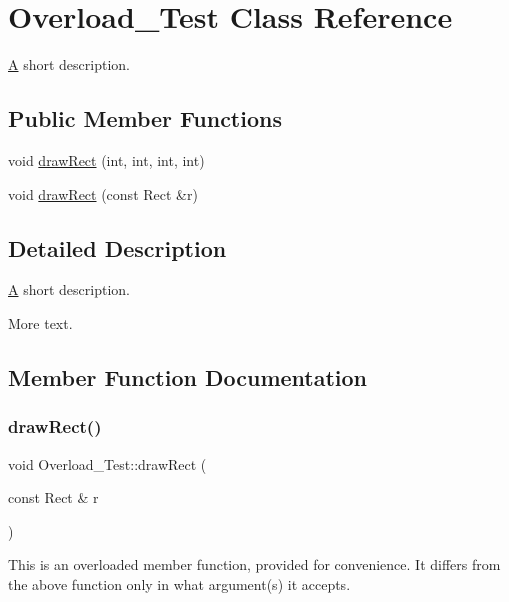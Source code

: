 \hypertarget{class_overload___test}{}\section{Overload\+\_\+\+Test Class Reference}
\label{class_overload___test}


\mbox{\hyperlink{class_a}{A}} short description.  


\subsection*{Public Member Functions}
\begin{DoxyCompactItemize}
\item 
void \mbox{\hyperlink{class_overload___test_a840305784a1944b4de9826a1f4204365}{draw\+Rect}} (int, int, int, int)
\item 
void \mbox{\hyperlink{class_overload___test_a7a613f50092cbc0ef830a818d9f3409c}{draw\+Rect}} (const Rect \&r)
\end{DoxyCompactItemize}


\subsection{Detailed Description}
\mbox{\hyperlink{class_a}{A}} short description. 

More text. 

\subsection{Member Function Documentation}
\mbox{\label{class_overload___test_a7a613f50092cbc0ef830a818d9f3409c}} 
\subsubsection{\texorpdfstring{drawRect()}{drawRect()}\hspace{0.1cm}{\footnotesize\ttfamily [1/2]}}
{\footnotesize\ttfamily void Overload\+\_\+\+Test\+::draw\+Rect (\begin{DoxyParamCaption}\item[{const Rect \&}]{r }\end{DoxyParamCaption})}

This is an overloaded member function, provided for convenience. It differs from the above function only in what argument(s) it accepts.\mbox{\label{class_overload___test_a840305784a1944b4de9826a1f4204365}} 
